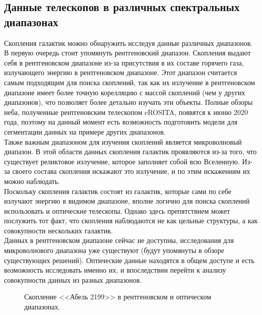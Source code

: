 \subsection{Данные телескопов в различных спектральных диапазонах}

Скопления галактик можно обнаружить исследуя данные различных диапазонов.\\

В первую очередь стоит упомянуть рентгеновский диапазон. Скопления выдают себя в рентгеновском 
диапазоне из-за присутствия в их составе горячего газа, излучающего энергию в рентгеновском 
диапазоне. Этот диапазон считается самым подходящим для поиска скоплений, так как их излучение 
в рентгеновском диапазоне имеет более точную корелляцию с массой скоплений (чем у других диапазонов), 
что позволяет более детально изучать эти объекты. Полные обзоры неба, полученные рентгеновским 
телескопом eROSITA, появятся к июню 2020 года, поэтому на данный момент есть возможность 
подготовить модели для сегментации данных на примере других диапазонов.\\

Также важным диапазоном для изучения скоплений является микроволновый диапазон. В этой области данных 
скопления галактик проявляются из-за того, что существует реликтовое излучение, которое заполняет 
собой всю Вселенную. Из-за своего состава скопления искажают это излучение, и по этим искажениям 
их можно наблюдать.\\ 

Поскольку скопления галактик состоят из галактик, которые сами по себе излучают энергию в видимом 
диапазоне, вполне логично для поиска скоплений использовать и оптические телескопы. Однако здесь 
препятствием может послужить тот факт, что скопления наблюдаются не как цельные структуры, а как 
совокупности нескольких галактик. \\

Данных в рентгеновском диапазоне сейчас не доступны, исследования для микроволнового диапазона уже 
существуют (будут упомянуты в обзоре существующих решений). Оптические данные находятся в общем 
доступе и есть возможность исследовать именно их, и впоследствии перейти к анализу совокупности 
данных из разных диапазонов.\\

\begin{figure}[h]
    \caption{Скопление <<Абель 2199>> в рентгеновском и оптическом диапазонах. \cite{Abell}}
\end{figure}


